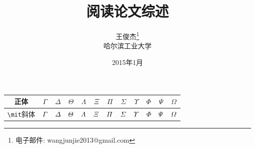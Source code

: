 \documentclass[a4paper, 11pt]{article}
\newcommand{\xiaosihao}{\fontsize{12pt}{\baselineskip}\selectfont}
\begin{document}
\begin{CJK}{UTF8}{gbsn}

\newtheorem{example}{例}             %
\newtheorem{algorithm}{算法}
\newtheorem{theorem}{定理}[section]  %
\newtheorem{definition}{定义}
\newtheorem{axiom}{公理}
\newtheorem{property}{性质}
\newtheorem{proposition}{命题}
\newtheorem{lemma}{引理}
\newtheorem{corollary}{推论}
\newtheorem{remark}{注解}
\newtheorem{condition}{条件}
\newtheorem{conclusion}{结论}
\newtheorem{assumption}{假设}

\renewcommand{\contentsname}{目录}  %
\renewcommand{\abstractname}{摘要}  %
\renewcommand{\refname}{参考文献}   %
\renewcommand{\indexname}{索引}
\renewcommand{\figurename}{图}
\renewcommand{\tablename}{表}
\renewcommand{\appendixname}{附录}
\renewcommand{\algorithm}{算法}


\title{ 阅读论文综述}
\author{王俊杰\footnote{电子邮件: wangjunjie2013@gmail.com}\\[2ex]
\xiaosihao 哈尔滨工业大学\\[2ex]
}
\date{2015年1月}


\maketitle

 
 \begin{tabular}{|c|ccccccccccc|}
\hline
正体&$\Gamma$ & $\Delta$ & $\Theta$ & $\Lambda$ & $\Xi$ & $\Pi$ & $\Sigma$ & $\Upsilon$ & $\Phi$ & $\Psi$ & $\Omega$\\
\hline
\verb|\mit|斜体&$\mit\Gamma$ & $\mit\Delta$ & $\mit\Theta$ & $\mit\Lambda$ & $\mit\Xi$ & $\mit\Pi$ & $\mit\Sigma$ &  $\mit\Upsilon$ & $\mit\Phi$ & $\mit\Psi$ & $\mit\Omega$\\
\hline
\end{tabular}
 

\end{CJK}
\end{document}
